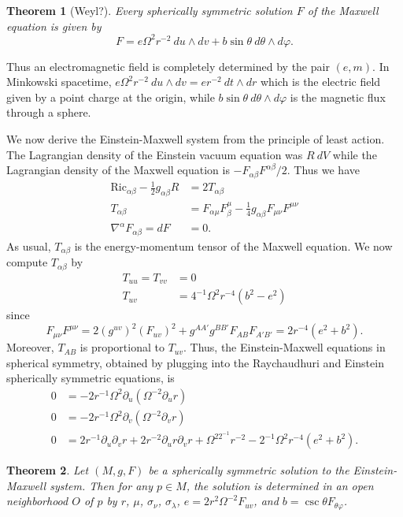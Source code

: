 \documentclass[12pt]{report}
\newcommand{\Ric}{\text{Ric}}
\newtheorem{theorem}{Theorem}[chapter]
\theoremstyle{definition}
\theoremstyle{remark}
\begin{document}
\begin{theorem}[Weyl?]
    Every spherically symmetric solution $F$ of the Maxwell equation is given by
    $$F = e\Omega^2r^{-2}~du\wedge dv + b\sin \theta ~d\theta \wedge d\varphi.$$
\end{theorem}
Thus an electromagnetic field is completely determined by the pair $(e, m)$. In Minkowski spacetime, $e\Omega^2r^{-2} ~du\wedge dv = er^{-2} ~dt \wedge dr$ which is the electric field given by a point charge at the origin, while $b\sin \theta ~d\theta \wedge d\varphi$ is the magnetic flux through a sphere.

We now derive the Einstein-Maxwell system from the principle of least action. The Lagrangian density of the Einstein vacuum equation was $R~dV$ while the Lagrangian density of the Maxwell equation is $-F_{\alpha\beta}F^{\alpha\beta}/2$. Thus we have
\begin{align*}
    \Ric_{\alpha\beta} - \frac{1}{2}g_{\alpha\beta}R &= 2T_{\alpha\beta}\\
    T_{\alpha\beta} &= F_{\alpha\mu}F^\mu_\beta - \frac{1}{4}g_{\alpha\beta} F_{\mu\nu} F^{\mu\nu}\\
    \nabla^\alpha F_{\alpha\beta} = dF &= 0.
\end{align*}
As usual, $T_{\alpha\beta}$ is the energy-momentum tensor of the Maxwell equation. We now compute $T_{\alpha\beta}$ by
\begin{align*}
    T_{uu} = T_{vv} &= 0\\
    T_{uv} &= 4^{-1} \Omega^2 r^{-4}(b^2 - e^2)
\end{align*}
since
$$F_{\mu\nu} F^{\mu\nu} = 2(g^{uv})^2 (F_{uv})^2 + g^{AA'}g^{BB'} F_{AB} F_{A'B'} = 2r^{-4}(e^2 + b^2).$$
Moreover, $T_{AB}$ is proportional to $T_{uv}$. Thus, the Einstein-Maxwell equations in spherical symmetry, obtained by plugging into the Raychaudhuri and Einstein spherically symmetric equations, is
\begin{align*}
    0 &= -2r^{-1}\Omega^2 \partial_u (\Omega^{-2} \partial_ur)\\
    0 &= -2r^{-1}\Omega^2 \partial_v (\Omega^{-2} \partial_vr)\\
    0 &= 2r^{-1}\partial_u\partial_v r + 2r^{-2}\partial_ur\partial_vr + \Omega^22^{-1}r^{-2} - 2^{-1}\Omega^2r^{-4}(e^2 + b^2).
\end{align*}
\begin{theorem}
    Let $(M, g, F)$ be a spherically symmetric solution to the Einstein-Maxwell system. Then for any $p \in M$, the solution is determined in an open neighborhood $O$ of $p$ by $r$, $\mu$, $\sigma_\nu$, $\sigma_\lambda$, $e = 2r^2\Omega^{-2}F_{uv}$, and $b = \csc \theta F_{\theta \varphi}$. 
\end{theorem}
\end{document}
